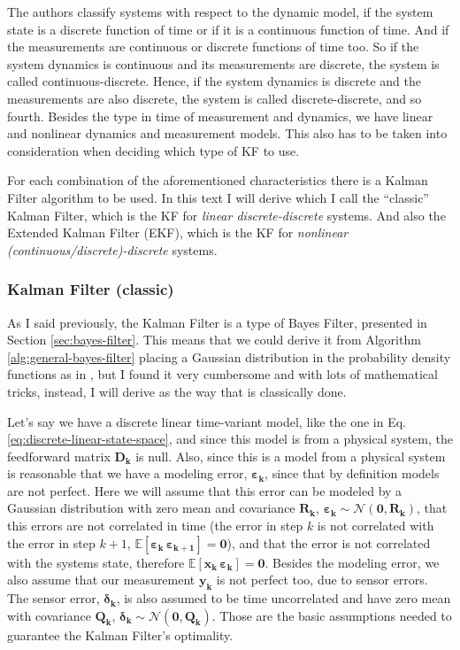 \documentclass[12pt]{article}
\newcommand{\bvec}[1]{\boldsymbol{\mathbf{#1}}} %
\newcommand{\mat}[1]{\boldsymbol{\mathbf{#1}}}
\newcommand{\brac}[1]{\left[#1\right]} %
\newcommand{\parentheses}[1]{\left(#1\right)}
\newcommand{\mb}[1]{{\boldsymbol{#1}}} %
\newcommand{\expv}[1]{\mathbb{E}\brac{#1}} %
\newcommand{\normal}[2]{\mathcal{N}\parentheses{#1, #2}}
\begin{document}
The authors classify systems with respect to the dynamic model, if the system state is a discrete function of time or if it is a continuous function of time. And if the measurements are continuous or discrete functions of time too. So if the system dynamics is continuous and its measurements are discrete, the system is called continuous-discrete. Hence, if the system dynamics is discrete and the measurements are also discrete, the system is called discrete-discrete, and so fourth. Besides the type in time of measurement and dynamics, we have linear and nonlinear dynamics and measurement models. This also has to be taken into consideration when deciding which type of KF to use.

For each combination of the aforementioned characteristics there is a Kalman Filter algorithm to be used. In this text I will derive which I call the ``classic'' Kalman Filter, which is the KF for \textit{linear discrete-discrete} systems. And also the Extended Kalman Filter (EKF), which is the KF for \textit{nonlinear (continuous/discrete)-discrete} systems.

\subsubsection{Kalman Filter (classic)}
As I said previously, the Kalman Filter is a type of Bayes Filter, presented in Section \ref{sec:bayes-filter}. This means that we could derive it from Algorithm \ref{alg:general-bayes-filter} placing a Gaussian distribution in the probability density functions as in \cite[p.~45]{bongard2006probabilistic}, but I found it very cumbersome and with lots of mathematical tricks, instead, I will derive as the way that is classically done. 

Let's say we have a discrete linear time-variant model, like the one in Eq. \ref{eq:discrete-linear-state-space}, and since this model is from a physical system, the feedforward matrix $\mat{D_k}$ is null. Also, since this is a model from a physical system is reasonable that we have a modeling error, $\mb{\varepsilon}_\mathbf{k}$, since that by definition models are not perfect. Here we will assume that this error can be modeled by a Gaussian distribution with zero mean and covariance $\mat{R_k}$, $\mb{\varepsilon}_\mathbf{k} \sim \normal{\mat{0}}{\mat{R_k}}$, that this errors are not correlated in time (the error in step $k$ is not correlated with the error in step $k+1$, $\expv{\mb{\varepsilon}_\mathbf{k} \, \mb{\varepsilon}_\mathbf{k+1}} = \mat{0}$), and that the error is not correlated with the systems state, therefore $\expv{\bvec{x_k} \, \mb{\varepsilon}_\mathbf{k}} = \mat{0}$. Besides the modeling error, we also assume that our measurement $\bvec{y_k}$ is not perfect too, due to sensor errors. The sensor error, $\mb{\delta}_\mathbf{k}$, is also assumed to be time uncorrelated and have zero mean with covariance $\mat{Q_k}$, $\mb{\delta}_\mathbf{k} \sim \normal{\mat{0}}{\mat{Q_k}}$.
Those are the basic assumptions needed to guarantee the Kalman Filter's optimality.
\end{document}
